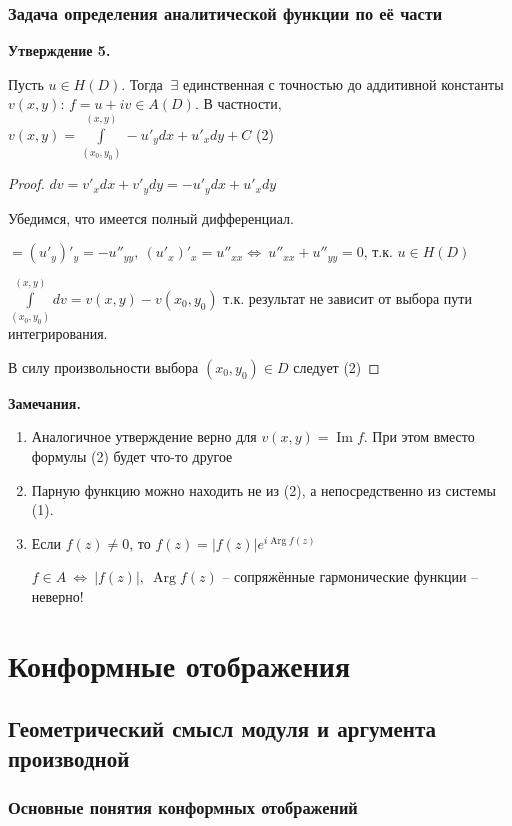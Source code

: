 \documentclass[draft]{report}
\newcommand{\mint}[2]{\underset{#1}{\overset{#2}{\int}}}
\newcommand{\LRA}{\Leftrightarrow}
\renewcommand{\Im}{\mathop{\mathrm{Im}}\nolimits}
\newcommand{\Arg}{\mathop{\mathrm{Arg}}\nolimits}
\newcommand{\E}{\ \exists}
\theoremstyle{remark}
\begin{document}
\subsection{Задача определения аналитической функции по её части}

{\bfseries Утверждение 5.}

Пусть $u\in H(D)$. Тогда $\E$ единственная с точностью до аддитивной константы $v(x,y)$: $f=u+iv\in A(D)$. В частности, $v(x,y)=\mint{(x_0,y_0)}{(x,y)}-u'_ydx+u'_xdy+C$ (2)

\begin{proof}
$dv=v'_xdx+v'_ydy=-u'_ydx+u'_xdy$

Убедимся, что имеется полный дифференциал.

$=(u'_y)'_y=-u''_{yy},\ (u'_x)'_x=u''_{xx} \LRA\ u''_{xx}+u''_{yy}=0$, т.к. $u\in H(D)$

$\mint{(x_0,y_0)}{(x,y)}dv=v(x,y)-v(x_0,y_0)$ т.к. результат не зависит от выбора пути интегрирования.

В силу произвольности выбора $(x_0,y_0)\in D$ следует (2)
\end{proof}

{\bfseries Замечания.}
\begin{enumerate}
\item Аналогичное утверждение верно для $v(x,y)=\Im f$. При этом вместо формулы (2) будет что-то другое
\item Парную функцию можно находить не из (2), а непосредственно из системы (1).
\item Если $f(z)\neq 0$, то $f(z)=|f(z)|e^{i\Arg f(z)}$

$f\in A\ \LRA\ |f(z)|,\ \Arg f(z)$ -- сопряжённые гармонические функции -- неверно!
\end{enumerate}

\chapter{Конформные отображения}

\section{Геометрический смысл модуля и аргумента производной}

\subsection{Основные понятия конформных отображений}
\end{document}
